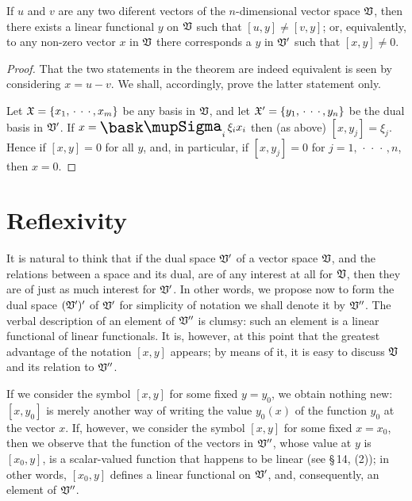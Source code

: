 \begin{theorem}
    If \(u\) and \(v\) are any two diferent vectors of the \(n\)-dimensional
    vector space \(\mathfrak{V}\), then there exists a linear functional \(y\) on
    \(\mathfrak{V}\) such that \([u, y] \neq [v, y]\); or, equivalently, to any
    non-zero vector \(x\) in \(\mathfrak{V}\) there corresponds a \(y\) in \(\mathfrak{V}'\)
    such that \([x, y] \neq 0\).
\end{theorem}

\begin{proof}
    That the two statements in the theorem are indeed equivalent is seen by
    considering \(x = u - v\). We shall, accordingly, prove the latter statement
    only.

    Let \(\mathfrak{X} = \{x_1, \,\cdot\,\cdot\,\cdot\,, x_m\}\) be any basis in
    \(\mathfrak{V}\), and let \(\mathfrak{X}' = \{y_1, \,\cdot\,\cdot\,\cdot\,, y_n\}\) be
    the dual basis in \(\mathfrak{V}'\). If \(x = \sumx_i \xi_i x_i\) then (as above)
    \([x, y_j] = \xi_j\). Hence if \([x,y]=0\) for all \(y\), and, in
    particular, if \([x, y_j] = 0\) for \(j = 1, \,\cdot\,\cdot\,\cdot\,, n\),
    then \(x = 0\).
\end{proof}

\section{Reflexivity}

It is natural to think that if the dual space \(\mathfrak{V}'\) of a vector space
\(\mathfrak{V}\), and the relations between a space and its dual, are of any interest
at all for \(\mathfrak{V}\), then they are of just as much interest for \(\mathfrak{V}'\). In
other words, we propose now to form the dual space \((\mathfrak{V}')'\) of \(\mathfrak{V}'\) for
simplicity of notation we shall denote it by \(\mathfrak{V}''\). The verbal description
of an element of \(\mathfrak{V}''\) is clumsy: such an element is a linear functional of
linear functionals. It is, however, at this point that the greatest advantage of
the notation \([x, y]\) appears; by means of it, it is easy to discuss
\(\mathfrak{V}\) and its relation to \(\mathfrak{V}''\).

If we consider the symbol \([x,y]\) for some fixed \(y = y_0\), we obtain
nothing new: \([x, y_0]\) is merely another way of writing the value \(y_0(x)\)
of the function \(y_0\) at the vector \(x\). If, however, we consider the symbol
\([x,y]\) for some fixed \(x = x_0\), then we observe that the function of the
vectors in \(\mathfrak{V}''\), whose value at \(y\) is \([x_0, y]\), is a scalar-valued
function that happens to be linear (see \S\,14, (2)); in other words, \([x_0,
y]\) defines a linear functional on \(\mathfrak{V}'\), and, consequently, an element of
\(\mathfrak{V}''\).

